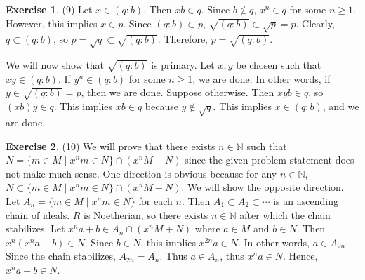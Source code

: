 \documentclass[12pt, psamsfonts]{amsart}
\theoremstyle{definition}
\newtheorem*{exer}{Exercise}
\theoremstyle{remark}
\numberwithin{equation}{section}
\begin{document}
\begin{exer}{(9)}
  Let $x \in (q:b)$.
  Then $xb \in q$.
  Since $b \notin q$, $x^n \in q$ for some $n \geq 1$.
  However, this implies $x \in p$.
  Since $(q:b) \subset p$, $\sqrt{(q:b)} \subset \sqrt{p} = p$.
  Clearly, $q \subset (q:b)$, so $p = \sqrt{q} \subset \sqrt{(q:b)}$.
  Therefore, $p = \sqrt{(q:b)}$.

  We will now show that $\sqrt{(q:b)}$ is primary.
  Let $x, y$ be chosen such that $xy \in (q:b)$.
  If $y^n \in (q:b)$ for some $n \geq 1$, we are done.
  In other words, if $y \in \sqrt{(q:b)} = p$, then we are done.
  Suppose otherwise.
  Then $xyb \in q$, so $(xb)y \in q$.
  This implies $xb \in q$ because $y \notin \sqrt{q}$.
  This implies $x \in (q:b)$, and we are done.
\end{exer}

\begin{exer}{(10)}
  We will prove that there exists $n \in \mathbb{N}$ such that $N = \{ m \in M \mid x^nm \in N \} \cap (x^nM + N)$ since the given problem statement does not make much sense.
  One direction is obvious because for any $n \in \mathbb{N}$, $N \subset \{ m \in M \mid x^nm \in N \} \cap (x^nM + N)$.
  We will show the opposite direction.
  Let $A_n = \{ m \in M \mid x^nm \in N \}$ for each $n$.
  Then $A_1 \subset A_2 \subset \cdots$ is an ascending chain of ideals.
  $R$ is Noetherian, so there exists $n \in \mathbb{N}$ after which the chain stabilizes.
  Let $x^na + b \in A_n \cap (x^nM + N)$ where $a \in M$ and $b \in N$.
  Then $x^n(x^na + b) \in N$.
  Since $b \in N$, this implies $x^{2n}a \in N$.
  In other words, $a \in A_{2n}$.
  Since the chain stabilizes, $A_{2n} = A_n$.
  Thus $a \in A_n$, thus $x^na \in N$.
  Hence, $x^na + b \in N$.
\end{exer}
\end{document}

